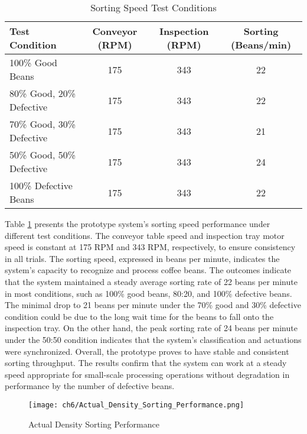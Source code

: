 \label{sec:sorting_speed}
\begin{table}[ht]
	\centering
	\small
	\caption{Sorting Speed Test Conditions}
	\label{tab:sorting_speed_test}
	\begin{tabularx}{\linewidth}{@{}>{\raggedright}X c c c@{}}
	\toprule
	\textbf{Test Condition} & \textbf{Conveyor (RPM)} & \textbf{Inspection (RPM)} & \textbf{Sorting (Beans/min)} \\
	\midrule
	100\% Good Beans & 175 & 343 & 22 \\
	80\% Good, 20\% Defective & 175 & 343 & 22 \\
	70\% Good, 30\% Defective & 175 & 343 & 21 \\
	50\% Good, 50\% Defective & 175 & 343 & 24 \\
	100\% Defective Beans & 175 & 343 & 22 \\
	\bottomrule
	\end{tabularx}
\end{table}
Table \ref{tab:sorting_speed_test} presents the prototype system's sorting speed performance under different test conditions. The conveyor table speed and inspection tray motor speed is constant at 175 RPM and 343 RPM, respectively, to ensure consistency in all trials. The sorting speed, expressed in beans per minute, indicates the system's capacity to recognize and process coffee beans. The outcomes indicate that the system maintained a steady average sorting rate of 22 beans per minute in most conditions, such as 100\% good beans, 80:20, and 100\% defective beans. The minimal drop to 21 beans per minute under the 70\% good and 30\% defective condition could be due to the long wait time for the beans to fall onto the inspection tray. On the other hand, the peak sorting rate of 24 beans per minute under the 50:50 condition indicates that the system's classification and actuations were synchronized. Overall, the prototype proves to have stable and consistent sorting throughput. The results confirm that the system can work at a steady speed appropriate for small-scale processing operations without degradation in performance by the number of defective beans.

\begin{figure}[H]
    \centering
    \texttt{[image: ch6/Actual\_Density\_Sorting\_Performance.png]}
    \caption{Actual Density Sorting Performance}
    \label{fig:actual_density_sorting_performance}
\end{figure}

